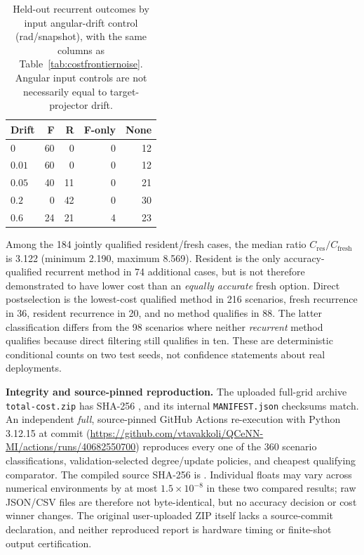 \documentclass[10pt]{article}
\begin{document}
\begin{table}[!htbp]\centering\small
\caption{Held-out recurrent outcomes by input angular-drift control
(rad/snapshot), with the same columns as Table~\ref{tab:costfrontiernoise}.
Angular input controls are not necessarily equal to target-projector drift.}
\label{tab:costfrontierdrift}
\begin{tabular}{lrrrr}\toprule
Drift & F & R & F-only & None\\\midrule
$0$ & 60 & 0 & 0 & 12\\
$0.01$ & 60 & 0 & 0 & 12\\
$0.05$ & 40 & 11 & 0 & 21\\
$0.2$ & 0 & 42 & 0 & 30\\
$0.6$ & 24 & 21 & 4 & 23\\\bottomrule
\end{tabular}
\end{table}

Among the 184 jointly qualified resident/fresh cases, the median ratio
$C_{\mathrm{res}}/C_{\mathrm{fresh}}$ is 3.122 (minimum 2.190, maximum
8.569). Resident is the only accuracy-qualified recurrent method in 74
additional cases, but is not therefore demonstrated to have lower cost
than an \emph{equally accurate} fresh option. Direct postselection is
the lowest-cost qualified method in 216 scenarios, fresh recurrence in 36,
resident recurrence in 20, and no method qualifies in 88.
The latter classification differs from the 98 scenarios where
neither \emph{recurrent} method qualifies because direct filtering
still qualifies in ten. These are deterministic conditional counts
on two test seeds, not confidence statements about real deployments.

\noindent\textbf{Integrity and source-pinned reproduction.}
The uploaded full-grid archive \texttt{total-cost.zip} has SHA-256
\texttt{},
and its internal \texttt{MANIFEST.json} checksums match. An independent
\emph{full}, source-pinned GitHub Actions re-execution with Python 3.12.15
at commit \texttt{}
(\url{https://github.com/vtavakkoli/QCeNN-MI/actions/runs/40682550700})
reproduces every one of the 360 scenario classifications, validation-selected
degree/update policies, and cheapest qualifying comparator. The compiled
 source SHA-256 is
\texttt{}.
Individual floats may vary across numerical environments by at most
$1.5\times10^{-8}$ in these two compared results; raw JSON/CSV files are
therefore not byte-identical, but no accuracy decision or cost winner changes.
The original user-uploaded ZIP itself lacks a source-commit declaration,
and neither reproduced report is hardware timing or finite-shot output
certification.
\end{document}

